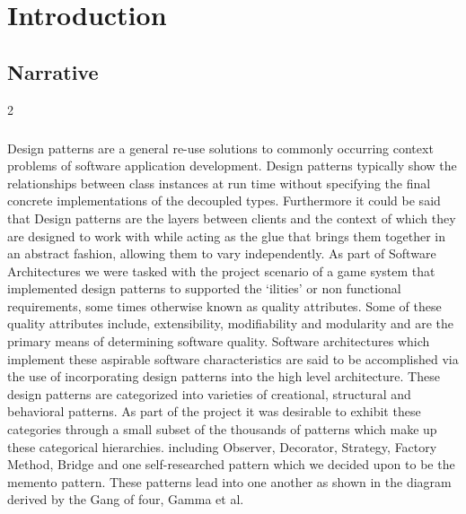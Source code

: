 \chapter{Introduction}
\setcounter{page}{1}
	\section{Narrative}
		\vspace{5mm}
	    \begin{multicols}{2}
		\paragraph{}
			Design patterns are a general re-use solutions to commonly occurring  context problems of software application development.   %
			Design patterns typically show the relationships between class instances at run time without specifying the final concrete 
			implementations of the decoupled types.  Furthermore it could be said that Design patterns are the layers between clients and 
			the context of which they are designed to work with while acting as the glue that brings them together in an abstract fashion, 
			allowing them to vary independently.  
			\newline
			\newline
			As part of Software Architectures we were tasked with the project scenario of a game system that implemented design patterns 
			to supported the ‘ilities’ or non functional requirements, some times otherwise known as quality attributes.  Some of these 
			quality attributes include, extensibility, modifiability and modularity and are the primary means of determining software quality.   
			Software architectures which implement these aspirable software characteristics are said to be accomplished via the use of 
			incorporating design patterns into the high level architecture. 
			\newline
			\newline 
			These design patterns are categorized into varieties of creational, structural and behavioral patterns.  As part of the project 
			it was desirable to exhibit these categories through a small subset of the thousands of patterns which make up these categorical 
			hierarchies.   including Observer, Decorator, Strategy, Factory Method, Bridge and one self-researched pattern which we decided 
			upon to be the memento pattern.  These patterns lead into one another  as shown in the diagram derived by the Gang of four, 
			Gamma et al.
			
		\end{multicols}
		
